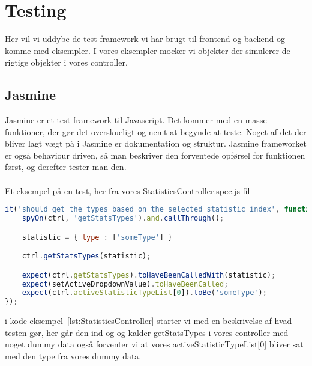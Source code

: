 \section{Testing}
Her vil vi uddybe de test framework vi har brugt til frontend og backend og komme
med eksempler. I vores eksempler mocker vi objekter der simulerer de rigtige objekter i vores controller.
\subsection{Jasmine}
Jasmine er et test framework til Javascript. Det kommer med en masse funktioner, 
der gør det overskueligt og nemt at begynde at teste.
Noget af det der bliver lagt vægt på i Jasmine er dokumentation og struktur. Jasmine frameworket er 
også behaviour driven, så man beskriver den forventede opførsel for funktionen først, og derefter tester man den.
\\\\
Et eksempel på en test, her fra vores StatisticsController.spec.js fil
\begin{lstlisting}[caption={StatisticsController.spec.js}, language={JavaScript}, label={lst:StatisticsController}]
it('should get the types based on the selected statistic index', function() {
    spyOn(ctrl, 'getStatsTypes').and.callThrough();

    statistic = { type : ['someType'] }

    ctrl.getStatsTypes(statistic);

    expect(ctrl.getStatsTypes).toHaveBeenCalledWith(statistic);
    expect(setActiveDropdownValue).toHaveBeenCalled;
    expect(ctrl.activeStatisticTypeList[0]).toBe('someType');
});
\end{lstlisting}
i kode eksempel~\ref{lst:StatisticsController} starter vi med en beskrivelse af hvad testen gør, her går den ind og og kalder getStatsTypes i vores controller
med noget dummy data også forventer vi at vores activeStatisticTypeList[0] bliver sat med den type fra vores dummy data.

